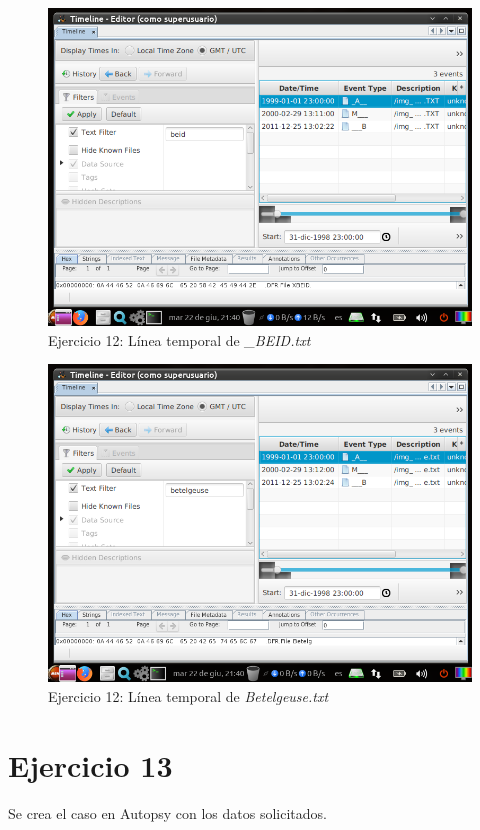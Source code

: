 \documentclass[11pt]{article}
\begin{document}
\begin{figure}[H]
    \caption{Ejercicio 12: Línea temporal de \textit{\_BEID.txt}}
    \centering
    \includegraphics[scale=0.7]{e12-9.png}
\end{figure}

\begin{figure}[H]
    \caption{Ejercicio 12: Línea temporal de \textit{Betelgeuse.txt}}
    \centering
    \includegraphics[scale=0.7]{e12-10.png}
\end{figure}

\section{Ejercicio 13}
Se crea el caso en Autopsy con los datos solicitados.
\end{document}
